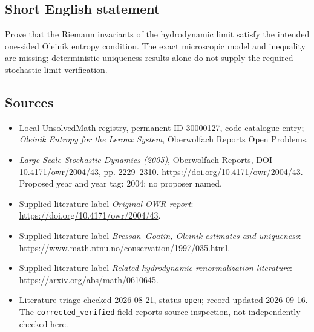 \documentclass[11pt]{article}
\begin{document}
\subsection{Short English statement}
Prove that the Riemann invariants of the hydrodynamic limit satisfy the intended one-sided Oleinik entropy condition. The exact microscopic model and inequality are missing; deterministic uniqueness results alone do not supply the required stochastic-limit verification.
\subsection{Sources}
\begin{itemize}\item Local UnsolvedMath registry, permanent ID 30000127, code catalogue entry; \emph{Oleinik Entropy for the Leroux System}, Oberwolfach Reports Open Problems.\item \emph{Large Scale Stochastic Dynamics (2005)}, Oberwolfach Reports, DOI 10.4171/owr/2004/43, pp. 2229--2310. \url{https://doi.org/10.4171/owr/2004/43}. Proposed year and year tag: 2004; no proposer named.\item Supplied literature label \emph{Original OWR report}: \url{https://doi.org/10.4171/owr/2004/43}.\item Supplied literature label \emph{Bressan--Goatin, Oleinik estimates and uniqueness}: \url{https://www.math.ntnu.no/conservation/1997/035.html}.\item Supplied literature label \emph{Related hydrodynamic renormalization literature}: \url{https://arxiv.org/abs/math/0610645}.\item Literature triage checked 2026-08-21, status \texttt{open}; record updated 2026-09-16. The \texttt{corrected\_verified} field reports source inspection, not independently checked here.\end{itemize}
\end{document}
